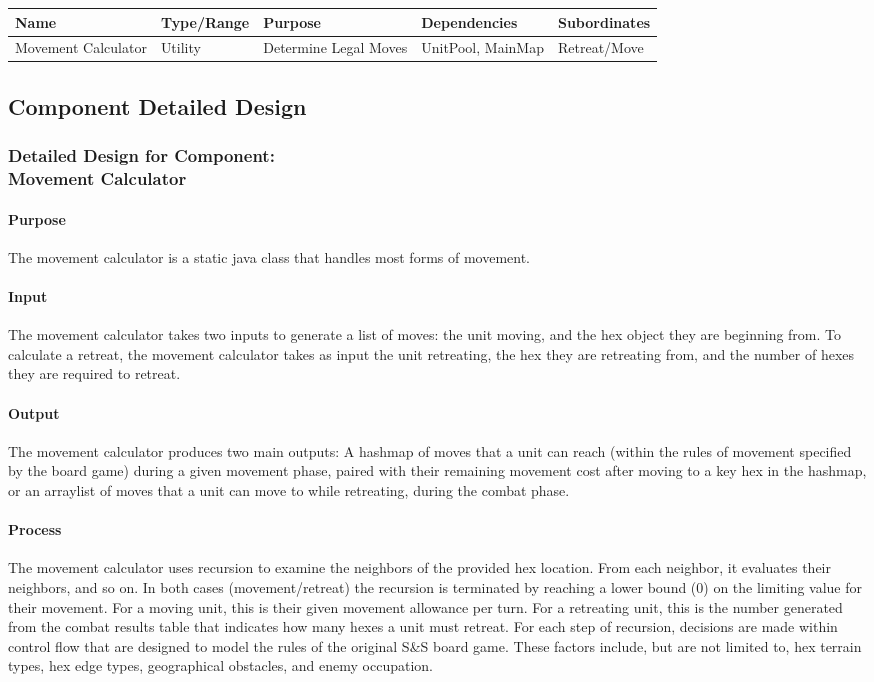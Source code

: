 \small{
\begin{center}
\noindent\begin{tabularx}{\linewidth}{|X|X|X|X|X|}\hline
\textbf{Name} & \textbf{Type/Range} & \textbf{Purpose} & \textbf{Dependencies} & \textbf{Subordinates}\\
\hline
Movement Calculator & Utility & Determine Legal Moves & UnitPool, MainMap & Retreat/Move\\
\hline
\end{tabularx}
\end{center}
}
	\subsection{Component Detailed Design}
		\subsubsection{Detailed Design for Component:\\Movement Calculator}
			\paragraph{Purpose} The movement calculator is a static java class that handles most forms of movement. 
			\paragraph{Input} The movement calculator takes two inputs to generate a list of moves: the unit moving, and the hex object they are beginning from. To calculate a retreat, the movement calculator takes as input the unit retreating, the hex they are retreating from, and the number of hexes they are required to retreat.
			\paragraph{Output} The movement calculator produces two main outputs: A hashmap of moves that a unit can reach (within the rules of movement specified by the board game) during a given movement phase, paired with their remaining movement cost after moving to a key hex in the hashmap, or an arraylist of moves that a unit can move to while retreating, during the combat phase.
			\paragraph{Process} The movement calculator uses recursion to examine the neighbors of the provided hex location. From each neighbor, it evaluates their neighbors, and so on. In both cases (movement/retreat) the recursion is terminated by reaching a lower bound (0) on the limiting value for their movement. For a moving unit, this is their given movement allowance per turn. For a retreating unit, this is the number generated from the combat results table that indicates how many hexes a unit must retreat. For each step of recursion, decisions are made within control flow that are designed to model the rules of the original S\&S board game. These factors include, but are not limited to, hex terrain types, hex edge types, geographical obstacles, and enemy occupation. 
